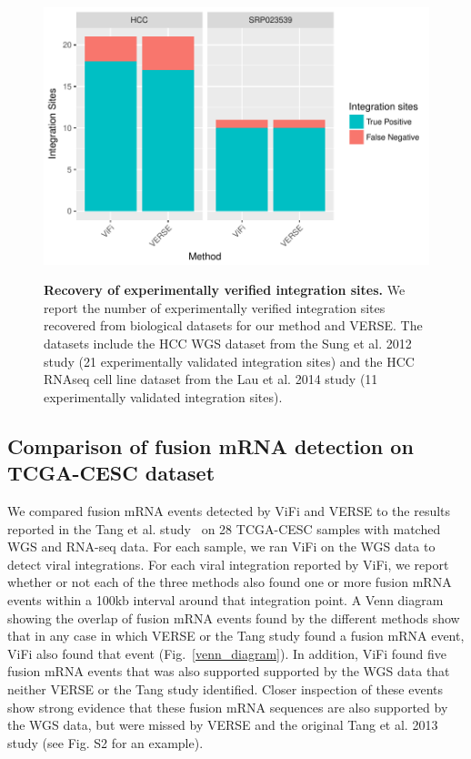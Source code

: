 \documentclass[12pt]{article}
\begin{document}
\begin{figure}[htpb]
  \centering
  \includegraphics[width=1\linewidth]{results/hcc.pdf}\\
\caption[Recovery of experimentally verified integration sites from biological datasets.]
{\label{bio_results}  {\bf Recovery of experimentally verified integration sites.}  We report the number of experimentally verified integration sites recovered from biological datasets for our method and VERSE.  The datasets include the HCC WGS dataset from the Sung et al. 2012 study (21 experimentally validated integration sites) and the HCC RNAseq cell line dataset from the Lau et al. 2014 study (11 experimentally validated integration sites).}
\end{figure}


\subsection{Comparison of fusion mRNA detection on TCGA-CESC dataset}
We compared fusion mRNA events detected by ViFi and VERSE to the results reported in the Tang et al. study~\cite{Tang2013} on 28 TCGA-CESC samples with matched WGS and RNA-seq data.  For each sample, we ran ViFi on the WGS data to detect viral integrations.  For each viral integration reported by ViFi, we report whether or not each of the three methods also found one or more fusion mRNA events within a 100kb interval around that integration point.  A Venn diagram showing the overlap of fusion mRNA events found by the different methods show that in any case in which VERSE or the Tang study found a fusion mRNA event, ViFi also found that event (Fig.~\ref{venn_diagram}).  In addition, ViFi found five fusion mRNA events that was also supported supported by the WGS data that neither VERSE or the Tang study identified.  Closer inspection of these events show strong evidence that these fusion mRNA sequences are also supported by the WGS data, but were missed by VERSE and the original Tang et al. 2013 study (see Fig. S2 for an example).
\end{document}
